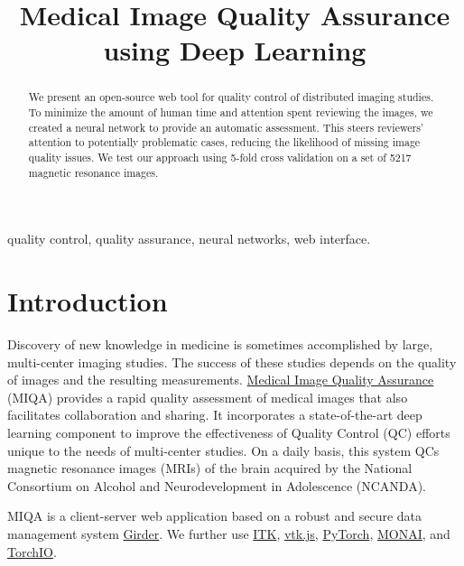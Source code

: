 \documentclass{midl} %
\title[Medical Image Quality Assurance using Deep Learning]{Medical Image Quality Assurance using Deep Learning}
\begin{document}
\maketitle

\begin{abstract}
We present an open-source web tool for quality control of distributed imaging studies.
To minimize the amount of human time and attention spent reviewing the images,
we created a neural network to provide an automatic assessment.
This steers reviewers' attention to potentially problematic cases,
reducing the likelihood of missing image quality issues.
We test our approach using 5-fold cross validation on a set of 5217 magnetic resonance images.
\end{abstract}

\begin{keywords}
quality control, quality assurance, neural networks, web interface.
\end{keywords}

\section{Introduction}

Discovery of new knowledge in medicine is sometimes accomplished by large, multi-center imaging studies. The success of these studies depends on the quality of images and the resulting measurements. 
\href{https://github.com/OpenImaging/miqa}{Medical Image Quality Assurance} (MIQA) provides a rapid quality assessment of medical images that also facilitates collaboration and sharing. It incorporates a state-of-the-art deep learning component to improve the effectiveness of Quality Control (QC) efforts unique to the needs of multi-center studies. On a daily basis, this system QCs magnetic resonance images (MRIs) of the brain acquired by the National Consortium on Alcohol and Neurodevelopment in Adolescence (NCANDA). 

MIQA is a client-server web application based on a robust and secure data management system \href{https://github.com/girder/girder}{Girder}. We further use \href{https://itk.org/}{ITK}, \href{https://kitware.github.io/vtk-js/index.html}{vtk.js}, \href{https://pytorch.org/}{PyTorch}, \href{https://monai.io/}{MONAI}, and \href{https://torchio.readthedocs.io/}{TorchIO}.
\end{document}
